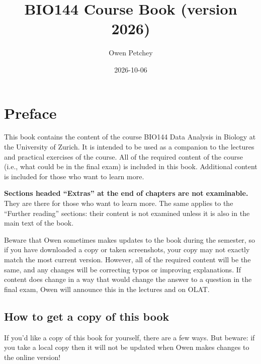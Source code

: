 \documentclass[
  letterpaper,
  8pt,
  a4paper]{book}
\title{BIO144 Course Book (version 2026)}
\author{Owen Petchey}
\date{2026-10-06}
\renewcommand*\contentsname{Table of contents}
\newcommand\contentsname{Table of contents}
\begin{document}
\frontmatter
\maketitle

\renewcommand*\contentsname{Table of contents}
{
\setcounter{tocdepth}{1}
\tableofcontents
}

\mainmatter
{}

\chapter*{Preface}\label{preface}


This book contains the content of the course BIO144 Data Analysis in
Biology at the University of Zurich. It is intended to be used as a
companion to the lectures and practical exercises of the course. All of
the required content of the course (i.e., what could be in the final
exam) is included in this book. Additional content is included for those
who want to learn more.

\textbf{Sections headed ``Extras'' at the end of chapters are not
examinable.} They are there for those who want to learn more. The same
applies to the ``Further reading'' sections: their content is not
examined unless it is also in the main text of the book.

Beware that Owen sometimes makes updates to the book during the
semester, so if you have downloaded a copy or taken screenshots, your
copy may not exactly match the most current version. However, all of the
required content will be the same, and any changes will be correcting
typos or improving explanations. If content does change in a way that
would change the answer to a question in the final exam, Owen will
announce this in the lectures and on OLAT.

\section*{How to get a copy of this
book}\label{how-to-get-a-copy-of-this-book}


If you'd like a copy of this book for yourself, there are a few ways.
But beware: if you take a local copy then it will not be updated when
Owen makes changes to the online version!
\end{document}
